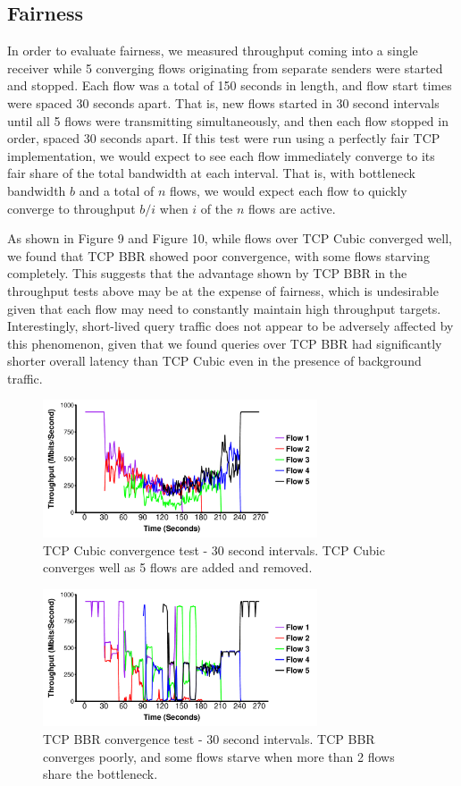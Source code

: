 \documentclass[letterpaper,twocolumn,10pt]{article}
\begin{document}
\subsection{Fairness}

In order to evaluate fairness, we measured throughput coming into a single receiver while 5 converging flows originating from separate senders were started and stopped. Each flow was a total of 150 seconds in length, and flow start times were spaced 30 seconds apart. That is, new flows started in 30 second intervals until all 5 flows were transmitting simultaneously, and then each flow stopped in order, spaced 30 seconds apart. If this test were run using a perfectly fair TCP implementation, we would expect to see each flow immediately converge to its fair share of the total bandwidth at each interval. That is, with bottleneck bandwidth $b$ and a total of $n$ flows, we would expect each flow to quickly converge to throughput $b/i$ when $i$ of the $n$ flows are active. 

As shown in Figure 9 and Figure 10, while flows over TCP Cubic converged well, we found that TCP BBR showed poor convergence, with some flows starving completely. This suggests that the advantage shown by TCP BBR in the throughput tests above may be at the expense of fairness, which is undesirable given that each flow may need to constantly maintain high throughput targets. Interestingly, short-lived query traffic does not appear to be adversely affected by this phenomenon, given that we found queries over TCP BBR had significantly shorter overall latency than TCP Cubic even in the presence of background traffic.

\begin{figure}
\includegraphics[height=1.6in,width=3.2in]{plots/cubic_converg.pdf}
\caption{TCP Cubic convergence test - 30 second intervals. TCP Cubic converges well as 5 flows are added and removed.}
\end{figure}

\begin{figure}
\includegraphics[height=1.6in,width=3.2in]{plots/bbr_converg.pdf}
\caption{TCP BBR convergence test - 30 second intervals. TCP BBR converges poorly, and some flows starve when more than 2 flows share the bottleneck.}
\end{figure}
\end{document}

